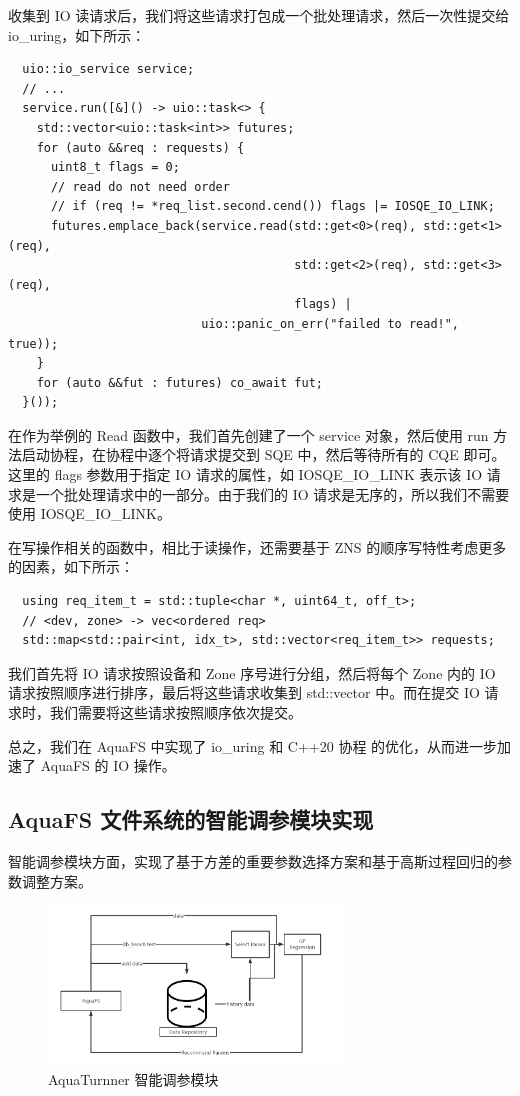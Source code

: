 收集到 IO 读请求后，我们将这些请求打包成一个批处理请求，然后一次性提交给 io\_uring，如下所示：

\begin{lstlisting}
  uio::io_service service;
  // ...
  service.run([&]() -> uio::task<> {
    std::vector<uio::task<int>> futures;
    for (auto &&req : requests) {
      uint8_t flags = 0;
      // read do not need order
      // if (req != *req_list.second.cend()) flags |= IOSQE_IO_LINK;
      futures.emplace_back(service.read(std::get<0>(req), std::get<1>(req),
                                        std::get<2>(req), std::get<3>(req),
                                        flags) |
                           uio::panic_on_err("failed to read!", true));
    }
    for (auto &&fut : futures) co_await fut;
  }());
\end{lstlisting}

在作为举例的 Read 函数中，我们首先创建了一个 service 对象，然后使用 run 方法启动协程，在协程中逐个将请求提交到 SQE 中，然后等待所有的 CQE 即可。这里的 flags 参数用于指定 IO 请求的属性，如 IOSQE\_IO\_LINK 表示该 IO 请求是一个批处理请求中的一部分。由于我们的 IO 请求是无序的，所以我们不需要使用 IOSQE\_IO\_LINK。

在写操作相关的函数中，相比于读操作，还需要基于 ZNS 的顺序写特性考虑更多的因素，如下所示：

\begin{lstlisting}
  using req_item_t = std::tuple<char *, uint64_t, off_t>;
  // <dev, zone> -> vec<ordered req>
  std::map<std::pair<int, idx_t>, std::vector<req_item_t>> requests;
\end{lstlisting}

我们首先将 IO 请求按照设备和 Zone 序号进行分组，然后将每个 Zone 内的 IO 请求按照顺序进行排序，最后将这些请求收集到 std::vector 中。而在提交 IO 请求时，我们需要将这些请求按照顺序依次提交。

总之，我们在 AquaFS 中实现了 io\_uring 和 C++20 协程 的优化，从而进一步加速了 AquaFS 的 IO 操作。

\subsection{AquaFS 文件系统的智能调参模块实现}

智能调参模块方面，实现了基于方差的重要参数选择方案和基于高斯过程回归的参数调整方案。

\begin{figure}[htbp]
  \centering
  \includegraphics[width=0.7\textwidth]{fig/aquaturnner.png}
  \caption{AquaTurnner 智能调参模块}
  \label{aquaturnner}
\end{figure}

